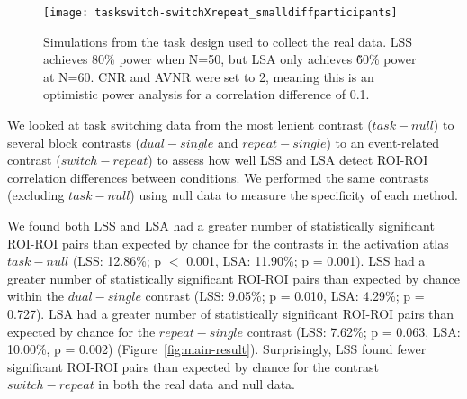 \documentclass[phd,appendix,figures]{uithesis}
\begin{document}
\begin{figure}[H]
  \texttt{[image: taskswitch-switchXrepeat\_smalldiffparticipants]}
  \caption[Simulation power analysis using real task design]{
    Simulations from the task design used to collect the real data.
    LSS achieves 80\% power when N=50, but LSA only achieves \~60\% power at N=60.
    CNR and AVNR were set to 2, meaning this is an optimistic power analysis
    for a correlation difference of 0.1.
  }
  \label{fig:taskswitch-simulation}
\end{figure}

We looked at task switching data from the most lenient
contrast ($task - null$) to several block contrasts ($dual - single$ and $repeat - single$)
to an event-related contrast ($switch - repeat$)
to assess how well LSS and LSA detect ROI-ROI correlation differences between conditions.
We performed the same contrasts (excluding $task - null$)
using null data to measure the specificity of each method.

We found both LSS and LSA had a greater number of statistically significant ROI-ROI pairs than expected by chance
for the contrasts in the activation atlas $task - null$ (LSS: 12.86\%; p $<$ 0.001, LSA: 11.90\%; p = 0.001).
LSS had a greater number of statistically significant ROI-ROI pairs than expected by chance within the 
$dual - single$ contrast (LSS: 9.05\%; p = 0.010, LSA: 4.29\%; p = 0.727).
LSA had a greater number of statistically significant ROI-ROI pairs than expected by chance for the
$repeat - single$ contrast (LSS: 7.62\%; p = 0.063, LSA: 10.00\%, p = 0.002) (Figure~\ref{fig:main-result}).
Surprisingly, LSS found fewer significant ROI-ROI pairs than expected by chance
for the contrast $switch - repeat$ in both the real data and null data. 
\end{document}
